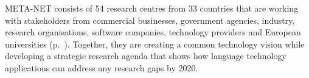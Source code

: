\begin{Parallel}[c]{78mm}{78mm}
{META-NET consists of 54 research centres from 33 countries that are working with stakeholders from commercial businesses, government agencies, industry, research organisations, software companies, technology providers and European universities (p.~\pageref{metanetmembers}). Together, they are creating a common technology vision while developing a strategic research agenda that shows how language technology applications can address any research gaps by 2020.
} 
\ParallelPar
\end{Parallel}

\makefundingnotice


\cleardoublepage


\tableofcontents



\cleardoublepage

\setcounter{page}{1}
\pagestyle{scrheadings}



